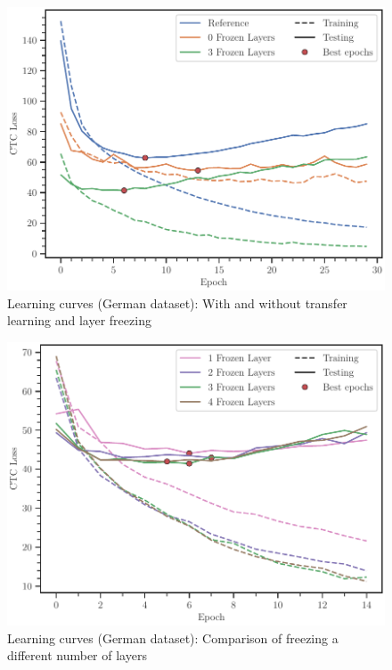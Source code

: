 \documentclass[11pt]{article}
\begin{document}
\begin{figure}[htbp]
    \centering
    \includegraphics{3curves_de.pdf}
    \caption{Learning curves (German dataset): With and without transfer learning and layer freezing}
    \label{fig:3c}
\end{figure}

\begin{figure}[htbp]
    \centering
    \includegraphics{4curves_de.pdf}
    \caption{Learning curves (German dataset): Comparison of freezing a different number of layers}
    \label{fig:4c}
\end{figure}
\end{document}
